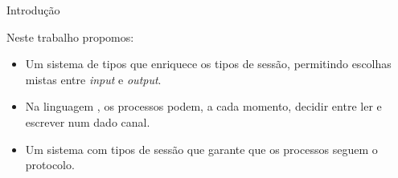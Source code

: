 \begin{frame}[fragile]{Introdução}

Neste trabalho propomos:
\begin{itemize}
\item Um sistema de tipos que enriquece os tipos de sessão, permitindo escolhas mistas entre \textit{input} e \textit{output}.
  \vspace{2mm}
  \pause
\item Na linguagem \mixedchoice, os processos podem, a cada momento, decidir entre ler e escrever num dado canal.
  \vspace{2mm}
  \pause
\item Um sistema com tipos de sessão que garante que os processos seguem o protocolo.
\end{itemize}

\end{frame}


